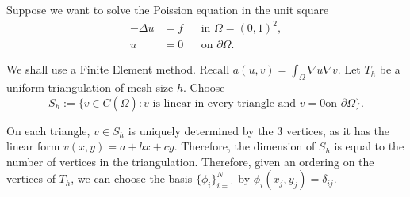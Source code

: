 \documentclass[a4paper,10pt,oneside]{book}
\theoremstyle{plain}%
\theoremstyle{definition}
\theoremstyle{remark}
\begin{document}
Suppose we want to solve the Poission equation in the unit square
\begin{align}
 -\Delta u &= f&&\text{in }\Omega=(0,1)^2,\\
         u &= 0&&\text{on }\partial\Omega.
\end{align}

We shall use a Finite Element method. Recall $a(u,v)=\int_{\Omega} \nabla
u\nabla v$. Let $T_h$ be a uniform triangulation of mesh size $h$. Choose
\begin{equation}
 S_h:=\{v\in C(\bar{\Omega}):v\text{ is linear in every triangle and }v=0\text{
on }\partial\Omega\}.
\end{equation}

On each triangle, $v\in S_h$ is uniquely determined by the 3 vertices, as it
has the linear form $v(x,y) = a+bx+cy$. Therefore, the dimension of $S_h$ is
equal to the number of vertices in the triangulation. Therefore, given an
ordering on the vertices of $T_h$, we can choose the basis $\{\phi_i\}_{i=1}^N$
by $\phi_i(x_j,y_j)=\delta_{ij}$.
\end{document}
